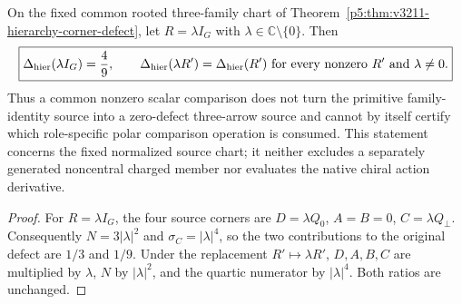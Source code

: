 \documentclass[12pt,a4paper]{article}
\begin{document}
\begin{corollary}
\label{p5:cor:v3024-primitive-hierarchy-defect}
On the fixed common rooted three-family chart of
Theorem~\ref{p5:thm:v3211-hierarchy-corner-defect}, let
\(R=\lambda I_G\) with \(\lambda\in\mathbb C\setminus\{0\}\).
Then
\[
 \boxed{\Delta_{\rm hier}(\lambda I_G)=\frac49,\qquad
 \Delta_{\rm hier}(\lambda R')=\Delta_{\rm hier}(R')
 \ \text{for every nonzero }R'\text{ and }\lambda\ne0.}
\]
Thus a common nonzero scalar comparison does not turn the primitive
family-identity source into a zero-defect three-arrow source and cannot
by itself certify which role-specific polar comparison operation is
consumed.  This statement concerns the fixed normalized source chart;
it neither excludes a separately generated noncentral charged member
nor evaluates the native chiral action derivative.
\end{corollary}
\begin{proof}
For \(R=\lambda I_G\), the four source corners are
\(D=\lambda Q_0\), \(A=B=0\), \(C=\lambda Q_\perp\).
Consequently \(N=3|\lambda|^2\) and
\(\sigma_C=|\lambda|^4\), so the two contributions to the original
defect are \(1/3\) and \(1/9\).  Under the replacement
\(R'\mapsto\lambda R'\), \(D,A,B,C\) are multiplied by
\(\lambda\), \(N\) by \(|\lambda|^2\), and the quartic
numerator by \(|\lambda|^4\).  Both ratios are unchanged.
\end{proof}
\end{document}
